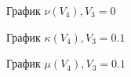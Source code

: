 \documentclass[12pt,a4paper]{article}
\begin{document}
    \pagebreak

    \begin{figure}[h]
        \caption{График $\nu(V_4), V_3 = 0$}
    \end{figure}

    \begin{figure}[h]
        \caption{График $\kappa(V_4), V_3 = 0.1$}
    \end{figure}

    \pagebreak

    \begin{figure}[h]
        \caption{График $\mu(V_4), V_3 = 0.1$}
    \end{figure}
\end{document}
